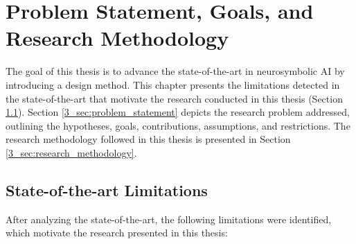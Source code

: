 \chapter{Problem Statement, Goals, and Research Methodology}\label{chap:methodology}

The goal of this thesis is to advance the state-of-the-art in neurosymbolic AI by introducing a design method. This chapter presents the limitations detected in the state-of-the-art that motivate the research conducted in this thesis (Section \ref{3_sec:limitations}). Section \ref{3_sec:problem_statement} depicts the research problem addressed, outlining the hypotheses, goals, contributions, assumptions, and restrictions. The research methodology followed in this thesis is presented in Section \ref{3_sec:research_methodology}.

\section{State-of-the-art Limitations}\label{3_sec:limitations}
After analyzing the state-of-the-art, the following limitations were identified, which motivate the research presented in this thesis:
